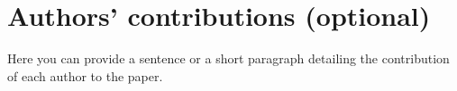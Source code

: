 \documentclass[charis,linguex]{glossa}
\begin{document}
\section*{Authors' contributions (optional)}\label{contrib}

Here you can provide a sentence or a short paragraph detailing the contribution of each author to the paper.

\nocite{*} %

\end{document}
